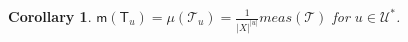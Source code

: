 \documentclass[12pt]{article}
\newcommand{\xmo}{X^{-\omega}}
\newcommand{\lims}[1][G]{\mathscr{J}_{#1}}
\newcommand{\si}{\mathsf{s}}
\newcommand{\muls}{\mathsf{m}}
\newcommand{\mgr}{meas}
\newcommand{\tile}{\mathscr{T}}
\newcommand{\T}{\mathsf{T}}
\newcommand{\nucl}{\mathcal{N}}
\newtheorem{cor}[theor]{Corollary}
\theoremstyle{definition}
\begin{document}
\begin{cor}
$\muls(\T_u)=\mu(\tile_u)=\frac{1}{|X|^{|u|}}\mgr(\tile)$ for $u\in\mathcal{U}^*$.
\end{cor}




%
%
%
\end{document}
